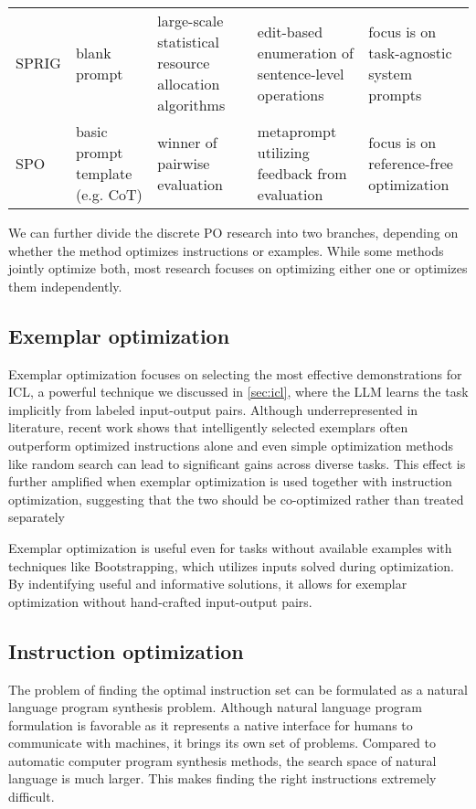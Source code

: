 \begin{landscape}
\begin{table}[htbp]
\begin{tabularx}{\linewidth}{@{}l Y Y Y Y@{}}
SPRIG\cite{zhang2024sprigimprovinglargelanguage} & blank prompt & large-scale statistical resource allocation algorithms & edit-based enumeration of sentence-level operations & focus is on task-agnostic system prompts \\
SPO\cite{xiang2025selfsupervisedpromptoptimization} & basic prompt template (e.g. CoT) & winner of pairwise evaluation & metaprompt utilizing feedback from evaluation & focus is on reference-free optimization\\
\bottomrule
\end{tabularx}
\end{table}
\end{landscape}

We can further divide the discrete PO research into two branches, depending on whether 
the method optimizes instructions or examples. While some methods jointly optimize both, most
research focuses on optimizing either one or optimizes them independently. 

\subsection{Exemplar optimization}

Exemplar optimization focuses on selecting the most effective demonstrations for ICL, a powerful technique we discussed in \ref{sec:icl},
where the LLM learns the task implicitly from labeled input-output pairs. Although underrepresented in literature\cite{wan2024teachbettersmarterinstructions},
recent work\cite{opsahlong2024optimizinginstructionsdemonstrationsmultistage}\cite{wan2024teachbettersmarterinstructions} shows that intelligently selected
exemplars often outperform optimized instructions alone and even simple optimization methods like random search can lead to significant gains across diverse tasks.
This effect is further amplified when exemplar optimization is used together with instruction optimization, suggesting that the two should be co-optimized rather than treated separately\cite{wan2024teachbettersmarterinstructions}

Exemplar optimization is useful even for tasks without available examples with techniques like Bootstrapping\cite{khattab2023dspycompilingdeclarativelanguage},
which utilizes inputs solved during optimization. By indentifying useful and informative solutions, it allows for exemplar optimization without hand-crafted input-output pairs.


\subsection{Instruction optimization}
The problem of finding the optimal instruction set can be formulated as a natural language program synthesis problem\cite{zhou2023largelanguagemodelshumanlevel}.
Although natural language program formulation is favorable as it represents a 
native interface for humans to communicate with machines, it brings its own set of problems.
Compared to automatic computer program synthesis methods, the search space of natural language is much larger. 
This makes finding the right instructions extremely difficult. 

